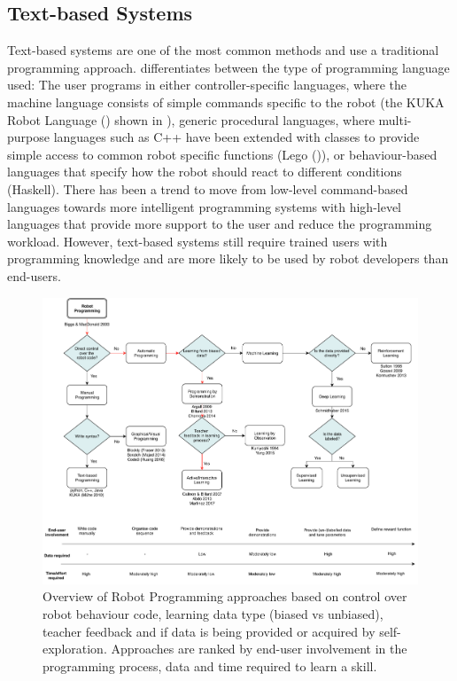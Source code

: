 \subsection{Text-based Systems}\label{sssec:Text-based Systems}
Text-based systems are one of the most common methods and use a traditional programming approach. 
\cite{Biggs2003} differentiates between the type of programming language used:
The user programs in either controller-specific languages, where the machine language consists of simple commands specific to the robot (\eg the KUKA Robot Language (\cite{braumann2011parametric,muhe2010reverse}) shown in ),
generic procedural languages, where multi-purpose languages such as C++ have been extended with classes to provide simple access to common robot specific functions ({\eg Lego (\cite{lego2003})}), or behaviour-based languages that specify how the robot should react to different conditions (\eg Haskell). 
There has been a trend to move from low-level command-based languages towards more intelligent programming systems with high-level languages that provide more support to the user and reduce the programming workload.
However, text-based systems still require trained users with programming knowledge and are more likely to be used by robot developers than end-users.

\clearpage
\begin{figure}
	\centering
	\includegraphics[width=0.95\linewidth]{figures/RobotProgrammingOverview}
	\caption{Overview of Robot Programming approaches based on control over robot behaviour code, learning data type (biased vs unbiased), teacher feedback and if data is being provided or acquired by self-exploration. Approaches are ranked by end-user involvement in the programming process, data and time required to learn a skill.}
	\label{fig:RobotProgrammingOverview}
\end{figure}
\clearpage


